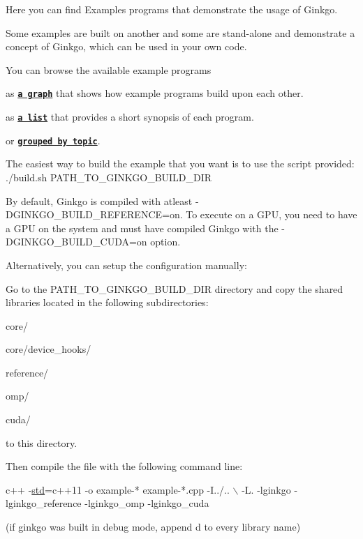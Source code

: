 Here you can find Examples programs that demonstrate the usage of Ginkgo.

Some examples are built on another and some are stand-\/alone and demonstrate a concept of Ginkgo, which can be used in your own code.

You can browse the available example programs 
\begin{DoxyEnumerate}
\item as {\bfseries \href{#graph}{\tt a graph}} that shows how example programs build upon each other. 
\item as {\bfseries \href{#list}{\tt a list}} that provides a short synopsis of each program. 
\item or {\bfseries \href{#topic}{\tt grouped by topic}}. 
\end{DoxyEnumerate}

The easiest way to build the example that you want is to use the script provided\+: {\ttfamily ./build.sh P\+A\+T\+H\+\_\+\+T\+O\+\_\+\+G\+I\+N\+K\+G\+O\+\_\+\+B\+U\+I\+L\+D\+\_\+\+D\+IR }

By default, Ginkgo is compiled with atleast {\ttfamily -\/\+D\+G\+I\+N\+K\+G\+O\+\_\+\+B\+U\+I\+L\+D\+\_\+\+R\+E\+F\+E\+R\+E\+N\+CE=on}. To execute on a G\+PU, you need to have a G\+PU on the system and must have compiled Ginkgo with the {\ttfamily -\/\+D\+G\+I\+N\+K\+G\+O\+\_\+\+B\+U\+I\+L\+D\+\_\+\+C\+U\+DA=on} option.

Alternatively, you can setup the configuration manually\+:

Go to the {\ttfamily  P\+A\+T\+H\+\_\+\+T\+O\+\_\+\+G\+I\+N\+K\+G\+O\+\_\+\+B\+U\+I\+L\+D\+\_\+\+D\+IR } directory and copy the shared libraries located in the following subdirectories\+: 
\begin{DoxyEnumerate}
\item {\ttfamily core/} 
\item {\ttfamily core/device\+\_\+hooks/} 
\item {\ttfamily reference/} 
\item {\ttfamily omp/} 
\item {\ttfamily cuda/} 
\end{DoxyEnumerate}to this directory.

Then compile the file with the following command line\+: 
\begin{DoxyCode}
c++ -\hyperlink{namespacestd}{std}=c++11 -o example-* example-*.cpp -I../.. \(\backslash\)
-L. -lginkgo -lginkgo\_reference -lginkgo\_omp -lginkgo\_cuda
\end{DoxyCode}
 (if ginkgo was built in debug mode, append \textquotesingle{}d\textquotesingle{} to every library name)

